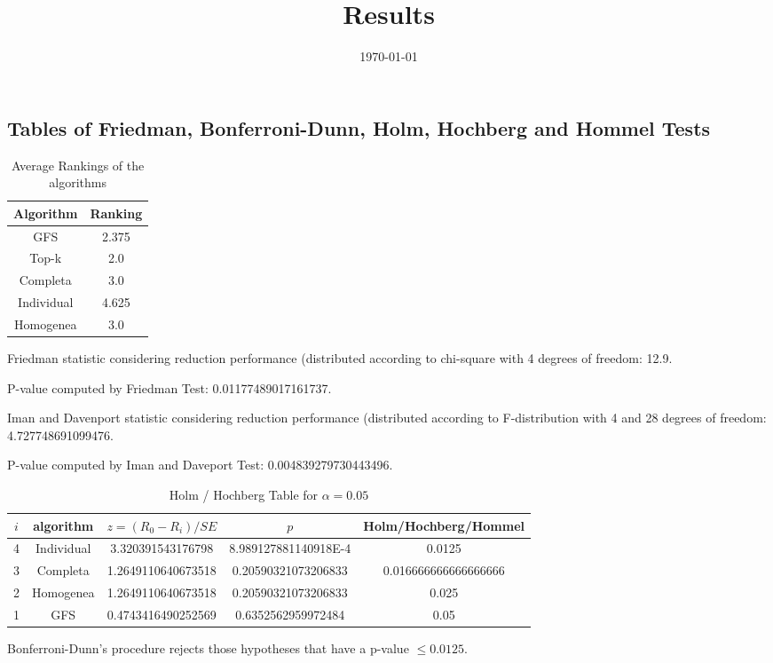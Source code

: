 \documentclass[a4paper,10pt]{article}
\title{Results}
\author{}
\date{\today}
\begin{document}
\begin{landscape}
\oddsidemargin 0in \topmargin 0in\maketitle
\section{Tables of Friedman, Bonferroni-Dunn, Holm, Hochberg and Hommel Tests}
\begin{table}[!htp]
\centering
\caption{Average Rankings of the algorithms
}\begin{tabular}{c|c}
Algorithm&Ranking\\
\hline
GFS&2.375\\
Top-k&2.0\\
Completa&3.0\\
Individual&4.625\\
Homogenea&3.0\\
\end{tabular}
\end{table}


Friedman statistic considering reduction performance (distributed according to chi-square with 4 degrees of freedom: 12.9.


P-value computed by Friedman Test: 0.01177489017161737.\newline

Iman and Davenport statistic considering reduction performance (distributed according to F-distribution with 4 and 28 degrees of freedom: 4.727748691099476.


P-value computed by Iman and Daveport Test: 0.004839279730443496.\newline

\begin{table}[!htp]
\centering\tiny
\caption{Holm / Hochberg Table for $\alpha=0.05$}
\begin{tabular}{ccccc}
$i$&algorithm&$z=(R_0 - R_i)/SE$&$p$&Holm/Hochberg/Hommel\\
\hline
4&Individual&3.320391543176798&8.989127881140918E-4&0.0125\\
3&Completa&1.2649110640673518&0.20590321073206833&0.016666666666666666\\
2&Homogenea&1.2649110640673518&0.20590321073206833&0.025\\
1&GFS&0.4743416490252569&0.6352562959972484&0.05\\
\hline
\end{tabular}
\end{table}
Bonferroni-Dunn's procedure rejects those hypotheses that have a p-value $\le0.0125$.



\end{landscape}
\end{document}
